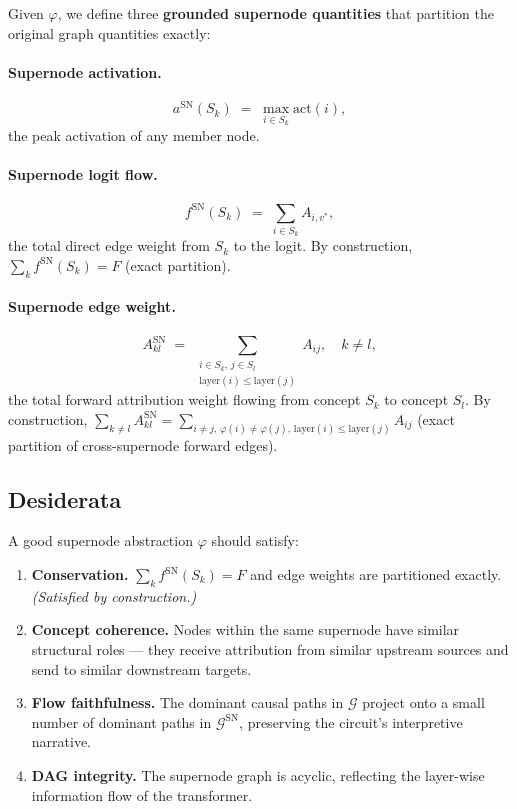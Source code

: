 \documentclass[11pt]{article}
\newcommand{\cG}{\mathcal{G}}
\newcommand{\1}{\mathbbm{1}}
\begin{document}
Given $\varphi$, we define three \textbf{grounded supernode quantities} that partition the original graph quantities exactly:

\paragraph{Supernode activation.}
\[
  a^{\mathrm{SN}}(S_k) \;=\; \max_{i \in S_k} \mathrm{act}(i),
\]
the peak activation of any member node.

\paragraph{Supernode logit flow.}
\[
  f^{\mathrm{SN}}(S_k) \;=\; \sum_{i \in S_k} A_{i,v^*},
\]
the total direct edge weight from $S_k$ to the logit.
By construction, $\sum_k f^{\mathrm{SN}}(S_k) = F$ (exact partition).

\paragraph{Supernode edge weight.}
\[
  A^{\mathrm{SN}}_{kl} \;=\; \sum_{\substack{i \in S_k,\, j \in S_l \\ \mathrm{layer}(i) \le \mathrm{layer}(j)}} A_{ij},
  \quad k \ne l,
\]
the total forward attribution weight flowing from concept $S_k$ to concept $S_l$.
By construction, $\sum_{k \ne l} A^{\mathrm{SN}}_{kl} = \sum_{i \ne j,\, \varphi(i) \ne \varphi(j),\, \mathrm{layer}(i) \le \mathrm{layer}(j)} A_{ij}$ (exact partition of cross-supernode forward edges).

\subsection{Desiderata}
\label{sec:desiderata}

A good supernode abstraction $\varphi$ should satisfy:
\begin{enumerate}[label=(D\arabic*), leftmargin=3em]
  \item \textbf{Conservation.} $\sum_k f^{\mathrm{SN}}(S_k) = F$ and edge weights are partitioned exactly. \emph{(Satisfied by construction.)}
  \item \textbf{Concept coherence.} Nodes within the same supernode have similar structural roles — they receive attribution from similar upstream sources and send to similar downstream targets.
  \item \textbf{Flow faithfulness.} The dominant causal paths in $\cG$ project onto a small number of dominant paths in $\cG^{\mathrm{SN}}$, preserving the circuit's interpretive narrative.
  \item \textbf{DAG integrity.} The supernode graph is acyclic, reflecting the layer-wise information flow of the transformer.
\end{enumerate}
\end{document}
